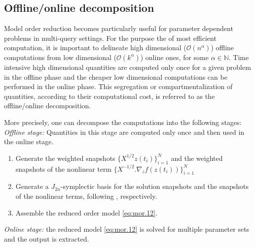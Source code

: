 \subsection{Offline/online decomposition} \label{sec:normmor.4}
Model order reduction becomes particularly useful for parameter dependent problems in multi-query settings. For the purpose the of most efficient computation, it is important to delineate high dimensional ($\mathcal{O}(n^{\alpha})$) offline computations from low dimensional ($\mathcal{O}(k^{\alpha})$) online ones, for some $\alpha \in \mathbb N$. Time intensive high dimensional quantities are computed only once for a given problem in the offline phase and the cheaper low dimensional computations can be performed in the online phase. This segregation or compartmentalization of quantities, according to their computational cost, is referred to as the offline/online decomposition.

More precisely, one can decompose the computations into the following stages:
\emph{Offline stage:} Quantities in this stage are computed only once and then used in the online stage.
\begin{enumerate}
\item Generate the weighted snapshots $\{ X^{1/2} z(t_i) \}_{i=1}^N$ and the weighted snapshots of the nonlinear term $\{X^{-1/2}. \nabla_zf(z(t_i))\}_{i=1}^N$
\item Generate a $J_{2n}$-symplectic basis for the solution snapshots and the snapshots of the nonlinear terms, following , respectively.
\item Assemble the reduced order model \cref{eq:mor.12}.
\end{enumerate}
\emph{Online stage:} the reduced model \cref{eq:mor.12} is solved for multiple parameter sets and the output is extracted.
